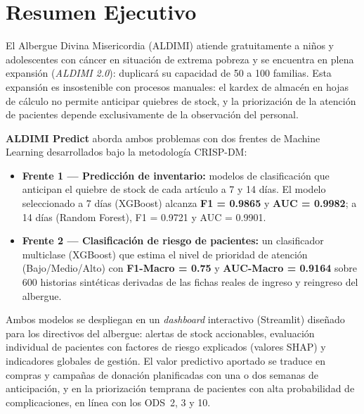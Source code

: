 
\section*{Resumen Ejecutivo}

El Albergue Divina Misericordia (ALDIMI) atiende gratuitamente a niños y
adolescentes con cáncer en situación de extrema pobreza y se encuentra en
plena expansión (\emph{ALDIMI 2.0}): duplicará su capacidad de 50 a 100
familias. Esta expansión es insostenible con procesos manuales: el kardex de
almacén en hojas de cálculo no permite anticipar quiebres de stock, y la
priorización de la atención de pacientes depende exclusivamente de la
observación del personal.

\textbf{ALDIMI Predict} aborda ambos problemas con dos frentes de Machine
Learning desarrollados bajo la metodología CRISP-DM:

\begin{itemize}[leftmargin=1.6em]
  \item \textbf{Frente 1 --- Predicción de inventario:} modelos de
        clasificación que anticipan el quiebre de stock de cada artículo a
        7 y 14 días. El modelo seleccionado a 7 días (XGBoost) alcanza
        \textbf{F1 = 0.9865} y \textbf{AUC = 0.9982}; a 14 días
        (Random Forest), F1 = 0.9721 y AUC = 0.9901.
  \item \textbf{Frente 2 --- Clasificación de riesgo de pacientes:} un
        clasificador multiclase (XGBoost) que estima el nivel de prioridad
        de atención (Bajo/Medio/Alto) con \textbf{F1-Macro = 0.75} y
        \textbf{AUC-Macro = 0.9164} sobre 600 historias sintéticas derivadas
        de las fichas reales de ingreso y reingreso del albergue.
\end{itemize}

Ambos modelos se despliegan en un \emph{dashboard} interactivo (Streamlit)
diseñado para los directivos del albergue: alertas de stock accionables,
evaluación individual de pacientes con factores de riesgo explicados
(valores SHAP) y indicadores globales de gestión. El valor predictivo
aportado se traduce en compras y campañas de donación planificadas con una
o dos semanas de anticipación, y en la priorización temprana de pacientes
con alta probabilidad de complicaciones, en línea con los ODS~2, 3 y 10.

